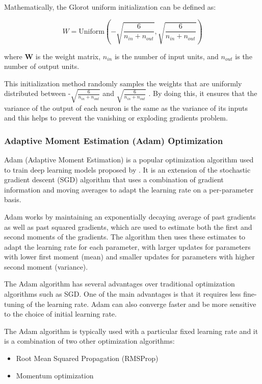 \documentclass[a4paper]{article}
\begin{document}
Mathematically, the Glorot uniform initialization can be defined as:

$$W = \text{Uniform}(-\sqrt{\frac{6}{n_{in} + n_{out}}},\sqrt{\frac{6}{n_{in} + n_{out}}})$$

where $\mathbf{W}$ is the weight matrix, $n_{in}$ is the number of input units, and $n_{out}$ is the number of output units.

This initialization method randomly samples the weights that are uniformly distributed between -$\sqrt{\frac{6}{n_{in} + n_{out}}}$ and $\sqrt{\frac{6}{n_{in} + n_{out}}}$ . By doing this, it ensures that the variance of the output of each neuron is the same as the variance of its inputs and this helps to prevent the vanishing or exploding gradients problem.
\subsubsection{Adaptive Moment Estimation (Adam) Optimization}
Adam (Adaptive Moment Estimation)  is a popular optimization algorithm used to train deep learning models proposed by \cite{kingma2014adam}. It is an extension of the stochastic gradient descent (SGD) algorithm that uses a combination of gradient information and moving averages to adapt the learning rate on a per-parameter basis.

Adam works by maintaining an exponentially decaying average of past gradients as well as past squared gradients, which are used to estimate both the first and second moments of the gradients. The algorithm then uses these estimates to adapt the learning rate for each parameter, with larger updates for parameters with lower first moment (mean) and smaller updates for parameters with higher second moment (variance).

The Adam algorithm has several advantages over traditional optimization algorithms such as SGD. One of the main advantages is that it requires less fine-tuning of the learning rate. Adam can also converge faster and be more sensitive to the choice of initial learning rate.

The Adam algorithm is typically used with a particular fixed learning rate and it is a combination of two other optimization algorithms:

\begin{itemize}[leftmargin=7.5pt]
    \item Root Mean Squared Propagation (RMSProp)
    \item Momentum optimization
\end{itemize}
\end{document}
